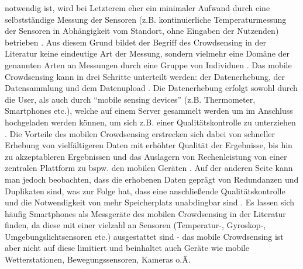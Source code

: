 notwendig ist, wird bei Letzterem eher ein minimaler Aufwand durch eine selbstständige Messung der Sensoren (z.B. kontinuierliche Temperaturmessung der Sensoren in Abhängigkeit vom Standort, ohne Eingaben der 
Nutzenden) betrieben \cite{Ganti2011}. Aus diesem Grund bildet der Begriff des Crowdsensing in der Literatur keine eindeutige Art der Messung, sondern vielmehr eine Domäne der genannten Arten an Messungen durch 
eine Gruppe von Individuen \cite{Ganti2011}. \newline Das mobile Crowdsensing kann in drei Schritte unterteilt werden: der Datenerhebung, der Datensammlung und dem Datenupload \cite{Ray2022}. Die Datenerhebung erfolgt 
sowohl durch die User, als auch durch \enquote{mobile sensing devices} (z.B. Thermometer, Smartphones etc.), welche auf einem Server gesammelt werden um im Anschluss hochgeladen werden können, um sich z.B. einer Qualitätskontrolle zu 
unterziehen \cite{Ray2022}. Die Vorteile des mobilen Crowdsensing erstrecken sich dabei von schneller Erhebung von vielfältigeren Daten mit erhöhter Qualität der Ergebnisse, bis hin zu akzeptableren Ergebnissen und das Auslagern von Rechenleistung 
von einer zentralen Plattform zu bspw. den mobilen Geräten \cite{Ray2022}. Auf der anderen Seite kann man jedoch beobachten, dass die erhobenen Daten geprägt von Redundanzen und Duplikaten sind, was zur Folge hat, dass eine 
anschließende Qualitätskontrolle und die Notwendigkeit von mehr Speicherplatz unabdingbar sind \cite{Ray2022}. Es lassen sich häufig Smartphones als Messgeräte des mobilen Crowdsensing in der Literatur finden, da diese mit einer vielzahl 
an Sensoren (Temperatur-, Gyroskop-, Umgebungslichtsensoren etc.) ausgestattet sind - das mobile Crowdsensing ist aber nicht auf diese limitiert und beinhaltet auch Geräte wie mobile Wetterstationen, Bewegungssensoren, Kameras o.Ä. 

